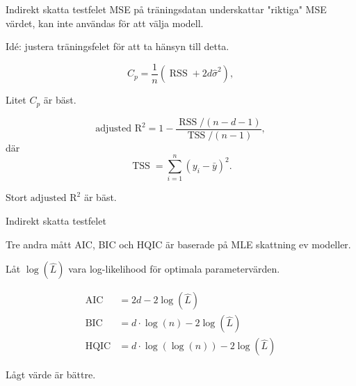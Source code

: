 \documentclass[10pt,english]{beamer}
\begin{document}
\begin{frame}{Indirekt skatta testfelet}
    MSE på träningsdatan underskattar "riktiga" MSE värdet, kan inte användas för att välja modell.

    Idé: justera träningsfelet för att ta hänsyn till detta. 

    \begin{equation*}
        C_p = \frac{1}{n} (\operatorname{RSS} + 2 d \hat{\sigma}^2),
    \end{equation*}

    Litet $C_p$ är bäst.

    \begin{equation*}
        \text{adjusted R}^2 = 1 - \frac{\operatorname{RSS}/(n-d-1)}{\operatorname{TSS}/(n-1)},
    \end{equation*}
    där
    \begin{equation*}
        \operatorname{TSS} = \sum_{i=1}^{n}(y_i - \bar{y})^2.
    \end{equation*}

    Stort $\text{adjusted R}^2$ är bäst.
\end{frame}

\begin{frame}{Indirekt skatta testfelet}
    
    Tre andra mått AIC, BIC och HQIC är baserade på MLE skattning ev modeller.

    Låt $\log(\hat{L})$ vara log-likelihood för optimala parametervärden.

    \begin{align*}
        \operatorname{AIC} &= 2 d - 2 \log(\hat{L}) \\
        \operatorname{BIC} &= d \cdot \log(n) - 2 \log(\hat{L}) \\
        \operatorname{HQIC} &= d \cdot \log(\log(n)) - 2 \log(\hat{L}) 
    \end{align*}

    Lågt värde är bättre.

\end{frame}
\end{document}

